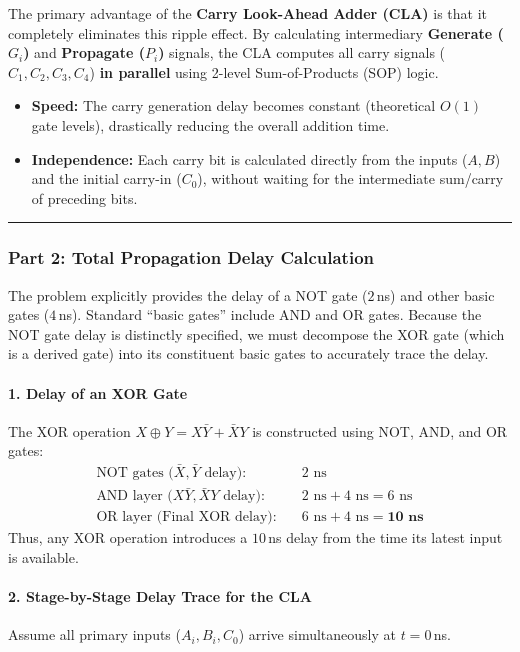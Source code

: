 \documentclass[12pt,a3paper]{article}
\begin{document}
\begin{enumerate}
\begin{tcolorbox}[enhanced,breakable,ansbox,colback=cD!4,colframe=cD,boxrule=0.8pt,arc=5pt,title={\textbf{Answer}},fonttitle=\bfseries\color{white},colbacktitle=cD]
The primary advantage of the \textbf{Carry Look-Ahead Adder (CLA)} is that it completely eliminates this ripple effect. By calculating intermediary \textbf{Generate ($G_i$)} and \textbf{Propagate ($P_i$)} signals, the CLA computes all carry signals ($C_1, C_2, C_3, C_4$) \textbf{in parallel} using 2-level Sum-of-Products (SOP) logic. 
\begin{itemize}
    \item \textbf{Speed:} The carry generation delay becomes constant (theoretical $O(1)$ gate levels), drastically reducing the overall addition time.
    \item \textbf{Independence:} Each carry bit is calculated directly from the inputs ($A, B$) and the initial carry-in ($C_0$), without waiting for the intermediate sum/carry of preceding bits.
\end{itemize}

\vspace{0.3cm}
\hrule
\vspace{0.3cm}

\subsubsection*{Part 2: Total Propagation Delay Calculation}

The problem explicitly provides the delay of a NOT gate ($2\,$ns) and other basic gates ($4\,$ns). Standard ``basic gates'' include AND and OR gates. Because the NOT gate delay is distinctly specified, we must decompose the XOR gate (which is a derived gate) into its constituent basic gates to accurately trace the delay.

\paragraph{1. Delay of an XOR Gate}
The XOR operation $X \oplus Y = X\bar{Y} + \bar{X}Y$ is constructed using NOT, AND, and OR gates:
\begin{align*}
    \text{NOT gates ($\bar{X}, \bar{Y}$ delay):} &\quad 2\text{ ns} \\
    \text{AND layer ($X\bar{Y}, \bar{X}Y$ delay):} &\quad 2\text{ ns} + 4\text{ ns} = 6\text{ ns} \\
    \text{OR layer (Final XOR delay):} &\quad 6\text{ ns} + 4\text{ ns} = \mathbf{10\text{ ns}}
\end{align*}
Thus, any XOR operation introduces a $10\,$ns delay from the time its latest input is available.

\paragraph{2. Stage-by-Stage Delay Trace for the CLA}
Assume all primary inputs ($A_i, B_i, C_0$) arrive simultaneously at $t = 0\,$ns.


\end{tcolorbox}
\end{enumerate}
\end{document}

